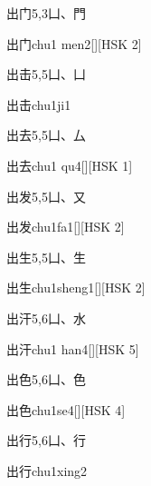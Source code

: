 \begin{entry}{出门}{5,3}{⼐、⾨}
  \begin{phonetics}{出门}{chu1 men2}[][HSK 2]
  \end{phonetics}
\end{entry}

\begin{entry}{出击}{5,5}{⼐、⼐}
  \begin{phonetics}{出击}{chu1ji1}
  \end{phonetics}
\end{entry}

\begin{entry}{出去}{5,5}{⼐、⼛}
  \begin{phonetics}{出去}{chu1 qu4}[][HSK 1]
  \end{phonetics}
\end{entry}

\begin{entry}{出发}{5,5}{⼐、⼜}
  \begin{phonetics}{出发}{chu1fa1}[][HSK 2]
  \end{phonetics}
\end{entry}

\begin{entry}{出生}{5,5}{⼐、⽣}
  \begin{phonetics}{出生}{chu1sheng1}[][HSK 2]
  \end{phonetics}
\end{entry}

\begin{entry}{出汗}{5,6}{⼐、⽔}
  \begin{phonetics}{出汗}{chu1 han4}[][HSK 5]
  \end{phonetics}
\end{entry}

\begin{entry}{出色}{5,6}{⼐、⾊}
  \begin{phonetics}{出色}{chu1se4}[][HSK 4]
  \end{phonetics}
\end{entry}

\begin{entry}{出行}{5,6}{⼐、⾏}
  \begin{phonetics}{出行}{chu1xing2}
  \end{phonetics}
\end{entry}

